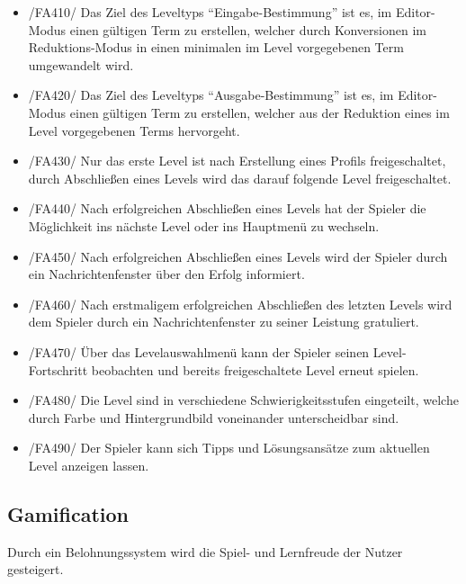\begin{itemize}
\item /FA410/ Das Ziel des Leveltyps "`Eingabe-Bestimmung"' ist es, im Editor-Modus einen gültigen Term zu erstellen, welcher durch Konversionen im Reduktions-Modus in einen minimalen im Level vorgegebenen Term umgewandelt wird.
\item /FA420/ Das Ziel des Leveltyps "`Ausgabe-Bestimmung"' ist es, im Editor-Modus einen gültigen Term zu erstellen, welcher aus der Reduktion eines im Level vorgegebenen Terms hervorgeht.
\item /FA430/ Nur das erste Level ist nach Erstellung eines Profils freigeschaltet, durch Abschließen eines Levels wird das darauf folgende Level freigeschaltet.
\item /FA440/ Nach erfolgreichen Abschließen eines Levels hat der Spieler die Möglichkeit ins nächste Level oder ins Hauptmenü zu wechseln.
\item /FA450/ Nach erfolgreichen Abschließen eines Levels wird der Spieler durch ein Nachrichtenfenster über den Erfolg informiert.
\item /FA460/ Nach erstmaligem erfolgreichen Abschließen des letzten Levels wird dem Spieler durch ein Nachrichtenfenster zu seiner Leistung gratuliert.
\item /FA470/ Über das Levelauswahlmenü kann der Spieler seinen Level-Fortschritt beobachten und bereits freigeschaltete Level erneut spielen.
\item /FA480/ Die Level sind in verschiedene Schwierigkeitsstufen eingeteilt, welche durch Farbe und Hintergrundbild voneinander unterscheidbar sind.
\item /FA490/ Der Spieler kann sich Tipps und Lösungsansätze zum aktuellen Level anzeigen lassen.
\end{itemize}

\subsection{Gamification}

Durch ein Belohnungssystem wird die Spiel- und Lernfreude der Nutzer gesteigert.


